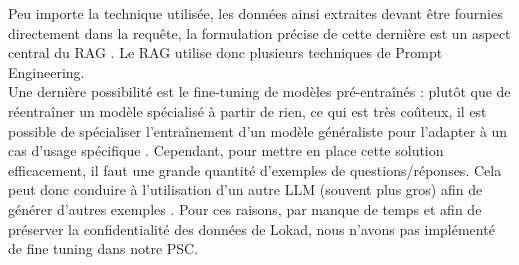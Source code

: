 Peu importe la technique utilisée, les données ainsi extraites devant être fournies directement dans la requête, la formulation précise de cette dernière est un aspect central du RAG \cite{Rice2025}. Le RAG utilise donc plusieurs techniques de Prompt Engineering.
\\

Une dernière possibilité est le fine-tuning de modèles pré-entraînés : plutôt que de réentraîner un modèle spécialisé à partir de rien, ce qui est très coûteux, il est possible de spécialiser l’entraînement d’un modèle généraliste pour l’adapter à un cas d’usage spécifique \cite{Pratap2025}. Cependant, pour mettre en place cette solution efficacement, il faut une grande quantité d’exemples de questions/réponses. Cela peut donc conduire à l’utilisation d’un autre LLM (souvent plus gros) afin de générer d’autres exemples \cite{Mulder2023}. Pour ces raisons, par manque de temps et afin de préserver la confidentialité des données de Lokad, nous n'avons pas implémenté de fine tuning dans notre PSC.